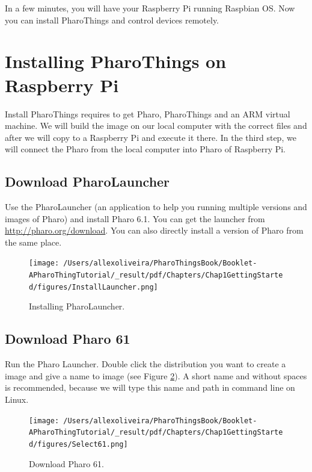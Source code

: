 \documentclass[10pt,twoside,english]{_support/latex/sbabook/sbabook}
\begin{document}
In a few minutes, you will have your Raspberry Pi running Raspbian OS.
Now you can install PharoThings and control devices remotely. 
\section{Installing PharoThings on Raspberry Pi}
Install PharoThings requires to get Pharo, PharoThings and an ARM virtual machine. We will build the image on our local computer with the correct files and after we will copy to a Raspberry Pi and execute it there. In the third step, we will connect the Pharo from the local computer into Pharo of Raspberry Pi.
\subsection{Download PharoLauncher}
Use the PharoLauncher (an application to help you running multiple versions and images of Pharo) and install Pharo 6.1. You can get the launcher from \url{http://pharo.org/download}.
You can also directly install a version of Pharo from the same place.


\begin{figure}

\begin{center}
\texttt{[image: /Users/allexoliveira/PharoThingsBook/Booklet-APharoThingTutorial/\_result/pdf/Chapters/Chap1GettingStarted/figures/InstallLauncher.png]}\caption{Installing PharoLauncher.\label{installLauncher}}\end{center}
\end{figure}

\subsection{Download Pharo 61}
Run the Pharo Launcher. Double click the distribution you want to create a image and give a name to image (see Figure \ref{InstallPharo61}). A short name and without spaces is recommended, because we will type this name and path in command line on Linux. 


\begin{figure}

\begin{center}
\texttt{[image: /Users/allexoliveira/PharoThingsBook/Booklet-APharoThingTutorial/\_result/pdf/Chapters/Chap1GettingStarted/figures/Select61.png]}\caption{Download Pharo 61.\label{InstallPharo61}}\end{center}
\end{figure}
\end{document}
